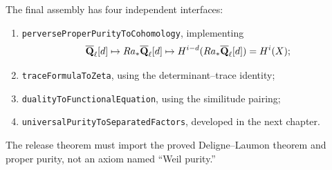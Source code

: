 \begin{formalization}
The final assembly has four independent interfaces:
\begin{enumerate}
\item \texttt{perverseProperPurityToCohomology}, implementing
      \[
      \overline{\mathbf Q}_\ell[d]\mapsto Ra_*\overline{\mathbf Q}_\ell[d]\mapsto
      H^{i-d}(Ra_*\overline{\mathbf Q}_\ell[d])=H^i(X);
      \]
\item \texttt{traceFormulaToZeta}, using the determinant--trace identity;
\item \texttt{dualityToFunctionalEquation}, using the similitude pairing;
\item \texttt{universalPurityToSeparatedFactors}, developed in the next
      chapter.
\end{enumerate}
The release theorem must import the proved Deligne--Laumon theorem and proper
purity, not an axiom named “Weil purity.”
\end{formalization}
